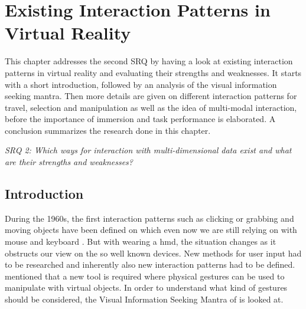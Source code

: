 
\section{Existing Interaction Patterns in Virtual Reality}

\label{SectionLiteratureReviewSRQ2}

This chapter addresses the second SRQ by having a look at existing interaction patterns in virtual reality and evaluating their strengths and weaknesses. It starts with a short introduction, followed by an analysis of the visual information seeking mantra. Then more details are given on different interaction patterns for travel, selection and manipulation as well as the idea of multi-modal interaction, before the importance of immersion and task performance is elaborated. A conclusion summarizes the research done in this chapter.
\begin{framed}
	\textit{SRQ 2: Which ways for interaction with multi-dimensional data exist and what are their strengths and weaknesses?}
\end{framed}


\subsection{Introduction}

During the 1960s, the first interaction patterns such as clicking or grabbing and moving objects have been defined on which even now we are still relying on with mouse and keyboard \citep{Myers1998}. But with wearing a \gls{hmd}, the situation changes as it obstructs our view on the so well known devices. New methods for user input had to be researched and inherently also new interaction patterns had to be defined. \cite{Donalek2014} mentioned that a new tool is required where physical gestures can be used to manipulate with virtual objects. In order to understand what kind of gestures should be considered, the Visual Information Seeking Mantra of \cite{Shneiderman1996} is looked at.



